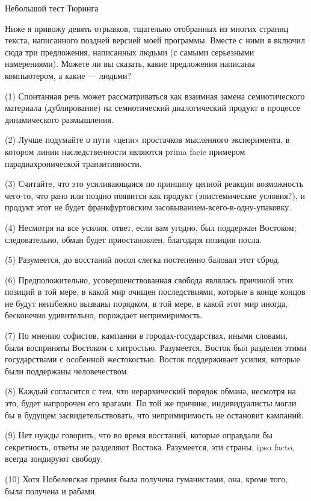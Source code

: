 \documentclass[../main.tex]{subfiles}
\begin{document}
Небольшой тест Тюринга

Ниже я привожу девять отрывков, тщательно отобранных из многих страниц текста, написанного поздней версией моей программы. Вместе с ними я включил сюда три предложения, написанных людьми (с самыми серьезными намерениями). Можете ли вы сказать, какие предложения написаны компьютером, а какие --- людьми?

(1) Спонтанная речь может рассматриваться как взаимная замена семиотического материала (дублирование) на семиотический диалогический продукт в процессе динамического размышления.

(2) Лучше подумайте о пути «цепи» простачков мысленного эксперимента, в котором линии наследственности являются prima facie примером парадиахронической транзитивности.

(3) Считайте, что это усиливающаяся по принципу цепной реакции возможность чего-то, что рано или поздно появится как продукт (эпистемические условия?), и продукт этот не будет франкфуртовским засовыванием-всего-в-одну-упаковку.

(4) Несмотря на все усилия, ответ, если вам угодно, был поддержан Востоком; следовательно, обман будет приостановлен, благодаря позиции посла.

(5) Разумеется, до восстаний посол слегка постепенно баловал этот сброд.

(6) Предположительно, усовершенствованная свобода являлась причиной этих позиций в той мере, в какой мир очищен последствиями, которые в конце концов не будут неизбежно вызваны порядком, в той мере, в какой этот мир иногда, бесконечно удивительно, порождает непримиримость.

(7) По мнению софистов, кампании в городах-государствах, иными словами, были восприняты Востоком с хитростью. Разумеется, Восток был разделен этими государствами с особенной жестокостью. Восток поддерживает усилия, которые были поддержаны человечеством.

(8) Каждый согласится с тем, что иерархический порядок обмана, несмотря на это, будет напророчен его врагами. По той же причине, индивидуалисты могли бы в будущем засвидетельствовать, что непримиримость не остановит кампаний.

(9) Нет нужды говорить, что во время восстаний, которые оправдали бы секретность, ответы не разделяют Востока. Разумеется, эти страны, ipso facto, всегда зондируют свободу.

(10) Хотя Нобелевская премия была получена гуманистами, она, кроме того, была получена и рабами.
\end{document}
